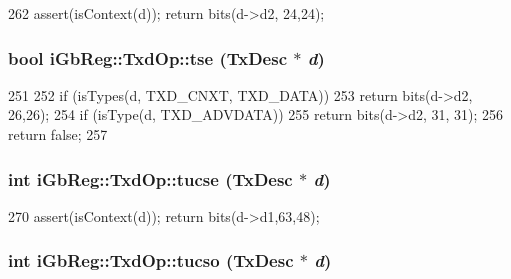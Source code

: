 \begin{DoxyCode}
262 { assert(isContext(d)); return bits(d->d2, 24,24); }
\end{DoxyCode}
\hypertarget{namespaceiGbReg_1_1TxdOp_a264ab0660d5fb172a75fa608a9ee3644}{
\subsubsection[{tse}]{\setlength{\rightskip}{0pt plus 5cm}bool iGbReg::TxdOp::tse (TxDesc $\ast$ {\em d})}}
\label{namespaceiGbReg_1_1TxdOp_a264ab0660d5fb172a75fa608a9ee3644}



\begin{DoxyCode}
251                             {
252     if (isTypes(d, TXD_CNXT, TXD_DATA))
253         return bits(d->d2, 26,26); 
254     if (isType(d, TXD_ADVDATA))
255         return bits(d->d2, 31, 31);
256     return false;
257 }
\end{DoxyCode}
\hypertarget{namespaceiGbReg_1_1TxdOp_a7e7992a96304e9319bf8788e4ba53838}{
\subsubsection[{tucse}]{\setlength{\rightskip}{0pt plus 5cm}int iGbReg::TxdOp::tucse (TxDesc $\ast$ {\em d})}}
\label{namespaceiGbReg_1_1TxdOp_a7e7992a96304e9319bf8788e4ba53838}



\begin{DoxyCode}
270 { assert(isContext(d)); return bits(d->d1,63,48); }
\end{DoxyCode}
\hypertarget{namespaceiGbReg_1_1TxdOp_acb1da37bb92cfcae7c477466c035aa7a}{
\subsubsection[{tucso}]{\setlength{\rightskip}{0pt plus 5cm}int iGbReg::TxdOp::tucso (TxDesc $\ast$ {\em d})}}
\label{namespaceiGbReg_1_1TxdOp_acb1da37bb92cfcae7c477466c035aa7a}



